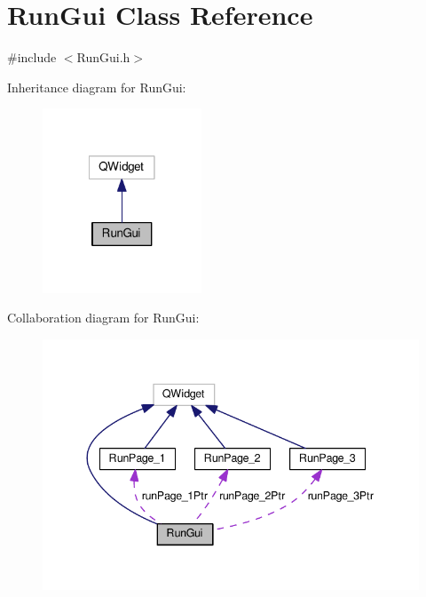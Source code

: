 \hypertarget{class_run_gui}{\section{Run\-Gui Class Reference}
\label{class_run_gui}
}


{\ttfamily \#include $<$Run\-Gui.\-h$>$}



Inheritance diagram for Run\-Gui\-:\nopagebreak
\begin{figure}[H]
\begin{center}
\leavevmode
\includegraphics[width=134pt]{class_run_gui__inherit__graph}
\end{center}
\end{figure}


Collaboration diagram for Run\-Gui\-:\nopagebreak
\begin{figure}[H]
\begin{center}
\leavevmode
\includegraphics[width=340pt]{class_run_gui__coll__graph}
\end{center}
\end{figure}
